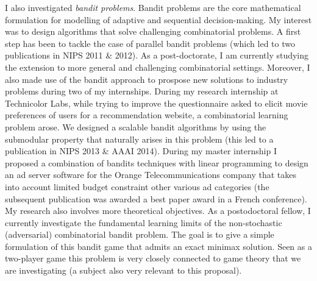 I also investigated \textit{bandit problems}. Bandit problems are the core mathematical formulation for modelling of adaptive and sequential decision-making. My interest was to design algorithms that solve challenging combinatorial problems. A first step has been to tackle the case of parallel bandit problems (which led to two publications in NIPS 2011 \& 2012). As a post-doctorate, I am currently studying the extension  to more general and challenging combinatorial settings. 
Moreover, I also  made use of the bandit approach to prospose new solutions to industry problems during two of my internships. During my research internship  at Technicolor Labs, while trying to improve the questionnaire asked to elicit movie preferences of users for a recommendation website, a combinatorial learning problem arose. We designed a scalable bandit algorithms by using the submodular property that naturally arises in this problem (this led to a publication in NIPS 2013 \& AAAI 2014). During my master internship I proposed a combination of bandits techniques with linear programming to design an ad server software for the Orange Telecommunications company that takes into account limited budget constraint other various ad categories (the subsequent publication was awarded a best paper award in a French conference).  My research also involves more theoretical objectives. As a postodoctoral fellow,  I currently investigate the fundamental learning limits of the non-stochastic (adversarial) combinatorial bandit problem. The goal is to give a simple formulation of this bandit game that admits an exact minimax solution. Seen as a two-player game this problem is very closely connected to game theory that we are investigating (a subject also very relevant to this proposal).



